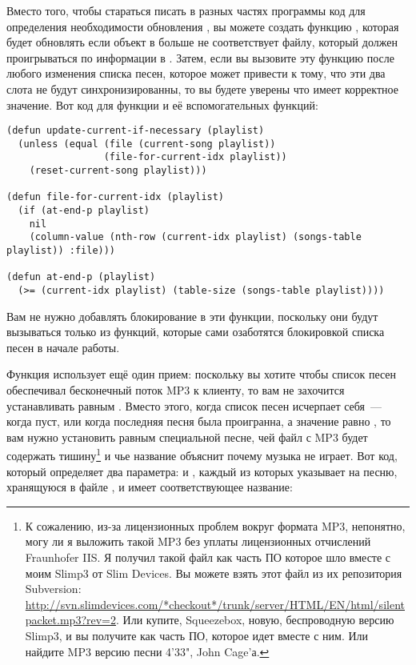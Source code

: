 Вместо того, чтобы стараться писать в разных частях программы код для определения
необходимости обновления , вы можете создать функцию
, которая будет обновлять  если
объект  в  больше не соответствует файлу, который должен
проигрываться по информации в . Затем, если вы вызовите эту функцию
после любого изменения списка песен, которое может привести к тому, что эти два слота не
будут синхронизированны, то вы будете уверены что  имеет корректное
значение.  Вот код для функции  и её вспомогательных
функций:

\begin{lstlisting}
(defun update-current-if-necessary (playlist)
  (unless (equal (file (current-song playlist))
                 (file-for-current-idx playlist))
    (reset-current-song playlist)))

(defun file-for-current-idx (playlist)
  (if (at-end-p playlist)
    nil
    (column-value (nth-row (current-idx playlist) (songs-table playlist)) :file)))

(defun at-end-p (playlist)
  (>= (current-idx playlist) (table-size (songs-table playlist))))
\end{lstlisting}

Вам не нужно добавлять блокирование в эти функции, поскольку они будут вызываться только
из функций, которые сами озаботятся блокировкой списка песен в начале работы.

Функция  использует ещё один прием: поскольку вы хотите чтобы
список песен обеспечивал бесконечный поток MP3 к клиенту, то вам не захочится
устанавливать  равным . Вместо этого, когда список песен
исчерпает себя~--- когда  пуст, или когда последняя песня была
проигранна, а значение  равно , то вам нужно установить
 равным специальной песне, чей файл с MP3 будет содержать
тишину\footnote{К сожалению, из-за лицензионных проблем вокруг формата MP3, непонятно,
  могу ли я выложить такой MP3 без уплаты лицензионных отчислений Fraunhofer IIS.  Я
  получил такой файл как часть ПО которое шло вместе с моим Slimp3 от Slim Devices. Вы
  можете взять этот файл из их репозитория Subversion:
  \url{http://svn.slimdevices.com/*checkout*/trunk/server/HTML/EN/html/silentpacket.mp3?rev=2}.
  Или купите, Squeezebox, новую, беспроводную версию Slimp3, и вы получите
   как часть ПО, которое идет вместе с ним. Или найдите MP3 версию
  песни 4'33", John Cage'а.} и чье название объяснит почему музыка не играет.  Вот код,
который определяет два параметра:  и
, каждый из которых указывает на песню, хранящуюся в файле
, и имеет соответствующее название:

